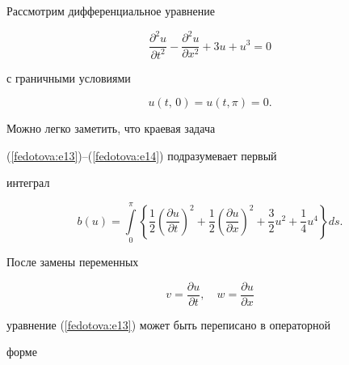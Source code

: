 
Рассмотрим дифференциальное уравнение

\begin{equation}

\label{fedotova:e13}

\displaystyle\frac{\partial^2u}{\partial

t^2}-\displaystyle\frac{\partial^2u}{\partial x^2}+3u+u^3=0

\end{equation}

с граничными условиями

\begin{equation}

\label{fedotova:e14} u(t,\,0)=u(t,\pi)=0.

\end{equation}

Можно легко заметить, что краевая задача

(\ref{fedotova:e13})--(\ref{fedotova:e14}) подразумевает первый

интеграл

\begin{equation}

\label{fedotova:e15}

b(u)=\displaystyle\int\limits_0^\pi\left\{\displaystyle\frac12\left(\frac{\partial

u}{\partial t}\right)^2+\frac12\left(\frac{\partial u}{\partial

x}\right)^2+\frac32u^2+\frac14u^4\right\}ds.

\end{equation}

После замены переменных

$$

v=\displaystyle\frac{\partial u}{\partial t},\quad

w=\displaystyle\frac{\partial u}{\partial x}

$$

уравнение (\ref{fedotova:e13}) может быть переписано в операторной

форме

